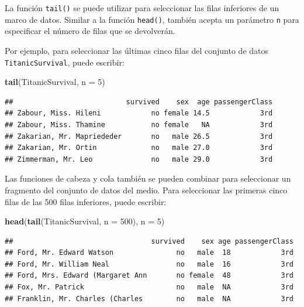 \documentclass[
]{book}
\newenvironment{Shaded}{\begin{snugshade}}{\end{snugshade}}
\newcommand{\DataTypeTok}[1]{\textcolor[rgb]{0.13,0.29,0.53}{#1}}
\newcommand{\DecValTok}[1]{\textcolor[rgb]{0.00,0.00,0.81}{#1}}
\newcommand{\KeywordTok}[1]{\textcolor[rgb]{0.13,0.29,0.53}{\textbf{#1}}}
\newcommand{\NormalTok}[1]{#1}
\begin{document}
La función \texttt{tail()} se puede utilizar para seleccionar las filas inferiores de un marco de datos. Similar a la función \texttt{head()}, también acepta un parámetro \texttt{n} para especificar el número de filas que se devolverán.

Por ejemplo, para seleccionar las últimas cinco filas del conjunto de datos \texttt{TitanicSurvival}, puede escribir:

\begin{Shaded}
\begin{Highlighting}[]
\KeywordTok{tail}\NormalTok{(TitanicSurvival, }\DataTypeTok{n =} \DecValTok{5}\NormalTok{)}
\end{Highlighting}
\end{Shaded}

\begin{verbatim}
##                           survived    sex  age passengerClass
## Zabour, Miss. Hileni            no female 14.5            3rd
## Zabour, Miss. Thamine           no female   NA            3rd
## Zakarian, Mr. Mapriededer       no   male 26.5            3rd
## Zakarian, Mr. Ortin             no   male 27.0            3rd
## Zimmerman, Mr. Leo              no   male 29.0            3rd
\end{verbatim}

Las funciones de cabeza y cola también se pueden combinar para seleccionar un fragmento del conjunto de datos del medio. Para seleccionar las primeras cinco filas de las 500 filas inferiores, puede escribir:

\begin{Shaded}
\begin{Highlighting}[]
\KeywordTok{head}\NormalTok{(}\KeywordTok{tail}\NormalTok{(TitanicSurvival, }\DataTypeTok{n =} \DecValTok{500}\NormalTok{), }\DataTypeTok{n =} \DecValTok{5}\NormalTok{)}
\end{Highlighting}
\end{Shaded}

\begin{verbatim}
##                                 survived    sex age passengerClass
## Ford, Mr. Edward Watson               no   male  18            3rd
## Ford, Mr. William Neal                no   male  16            3rd
## Ford, Mrs. Edward (Margaret Ann       no female  48            3rd
## Fox, Mr. Patrick                      no   male  NA            3rd
## Franklin, Mr. Charles (Charles        no   male  NA            3rd
\end{verbatim}
\end{document}
